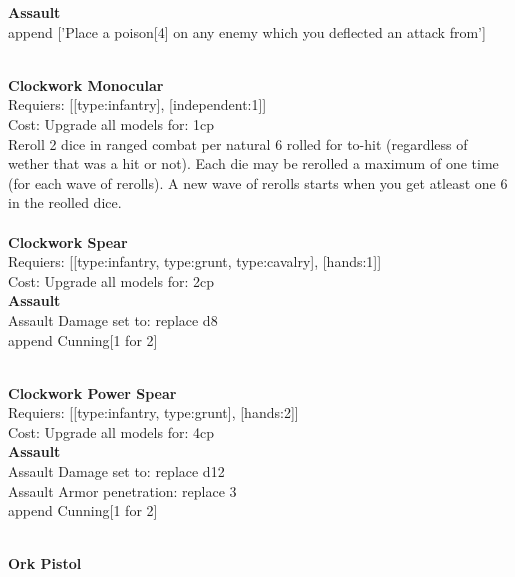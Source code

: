 {\bf Assault} \ \\

append ['Place a poison[4] on any enemy which you deflected an attack from']


\ \\
{\bf Clockwork Monocular } \\

Requiers: [[type:infantry], [independent:1]] \\
Cost: Upgrade all models for: 1cp \\
Reroll 2 dice in ranged combat per natural 6 rolled for to-hit (regardless of wether that was a hit or not). Each die may be rerolled a maximum of one time (for each wave of rerolls). A new wave of rerolls starts when you get atleast one 6 in the reolled dice.\\ 









\ \\
{\bf Clockwork Spear } \\

Requiers: [[type:infantry, type:grunt, type:cavalry], [hands:1]] \\
Cost: Upgrade all models for: 2cp \\




{\bf Assault} \ \\
Assault Damage set to: replace d8
\\ 

append Cunning[1 for 2]


\ \\
{\bf Clockwork Power Spear } \\

Requiers: [[type:infantry, type:grunt], [hands:2]] \\
Cost: Upgrade all models for: 4cp \\




{\bf Assault} \ \\
Assault Damage set to: replace d12
\\ 
Assault Armor penetration: replace 3 
\\ 

append Cunning[1 for 2]


\ \\
{\bf Ork Pistol } \\

